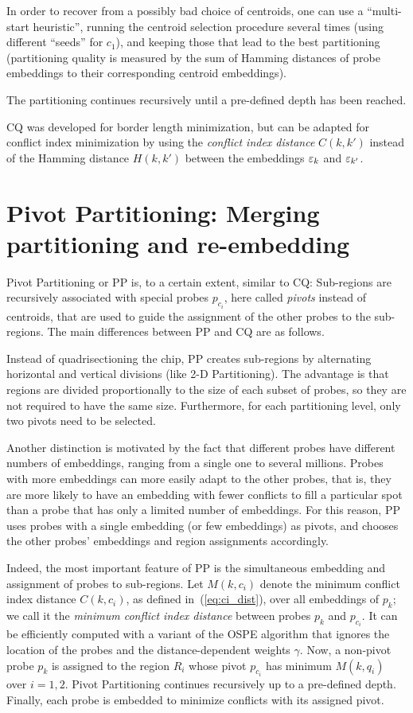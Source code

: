 In order to recover from a possibly bad choice of centroids, one can
use a ``multi-start heuristic'', running the centroid selection
procedure several times (using different ``seeds'' for $c_1$), and
keeping those that lead to the best partitioning (partitioning quality
is measured by the sum of Hamming distances of probe embeddings to
their corresponding centroid embeddings).

The partitioning continues recursively until a pre-defined depth has been
reached.

CQ was developed for border length minimization, but can be adapted
for conflict index minimization by using the \emph{conflict index
  distance} $C(k,k')$ instead of the Hamming distance $H(k,k')$
between the embeddings $\varepsilon_k$ and $\varepsilon_{k'}$.

\section{Pivot Partitioning: Merging partitioning and re-embedding}
\label{sec:part_pp}

Pivot Partitioning or PP \citep{Carvalho2006} is, to a certain extent,
similar to CQ: Sub-regions are recursively associated with special
probes $p_{c_i}$, here called \emph{pivots} instead of centroids, that
are used to guide the assignment of the other probes to the
sub-regions.  The main differences between PP and CQ are as follows.

Instead of quadrisectioning the chip, PP creates sub-regions by
alternating horizontal and vertical divisions (like 2-D Partitioning).
The advantage is that regions are divided proportionally to the size
of each subset of probes, so they are not required to have the same
size. Furthermore, for each partitioning level, only two pivots need
to be selected.

Another distinction is motivated by the fact that different probes
have different numbers of embeddings, ranging from a single one to
several millions.  Probes with more embeddings can more easily adapt
to the other probes, that is, they are more likely to have an
embedding with fewer conflicts to fill a particular spot than a probe
that has only a limited number of embeddings. For this reason, PP uses
probes with a single embedding (or few embeddings) as pivots, and
chooses the other probes' embeddings and region assignments accordingly.

Indeed, the most important feature of PP is the simultaneous embedding and
assignment of probes to sub-regions. Let $M(k,c_i)$ denote the minimum
conflict index distance $C(k,c_i)$, as defined in~(\ref{eq:ci_dist}), over all
embeddings of $p_k$; we call it the \emph{minimum conflict index distance}
between probes $p_k$ and $p_{c_i}$. It can be efficiently computed with a
variant of the OSPE algorithm that ignores the location of the probes and the
distance-dependent weights $\gamma$. Now, a non-pivot probe $p_k$ is assigned
to the region $R_i$ whose pivot $p_{c_i}$ has minimum $M(k,q_i)$ over $i=1,2$.
Pivot Partitioning continues recursively up to a pre-defined depth. Finally,
each probe is embedded to minimize conflicts with its assigned pivot.

